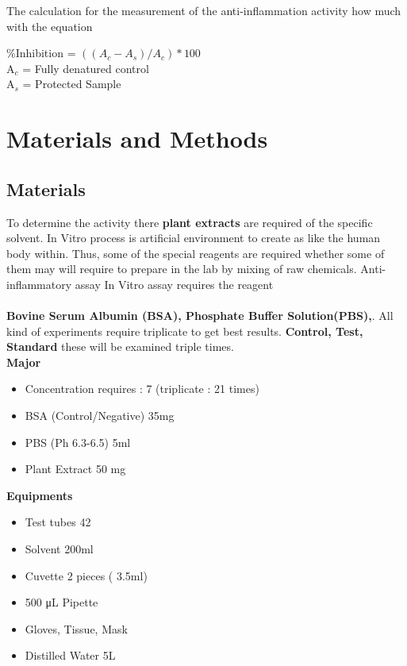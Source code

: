 \documentclass{comjnl}
\begin{document}
The calculation for the measurement of the anti-inflammation activity how much with the equation
\begin{center}
    \%Inhibition = $((A_c - A_s)/ A_c ) *100$ \\
  A$_{c}$ = Fully denatured control \\
  A$_{s}$ = Protected Sample
\end{center}


\section{Materials and Methods}  \label{Performance}

\subsection{Materials}
 To determine the activity there \textbf{plant extracts} are required of the specific solvent.
 In Vitro process is artificial environment to create as like the human body within. 
Thus, some of the special reagents are required whether some of them may will require to prepare in the lab by mixing of raw chemicals. Anti-inflammatory assay In Vitro assay requires the reagent 
 \\
 \\
\textbf{Bovine Serum Albumin (BSA), Phosphate Buffer Solution(PBS),}.
All kind of experiments require triplicate to get best results.
\textbf{Control, Test, Standard} these will be examined triple times. \\
\textbf{Major}
\begin{itemize}
    \item [1] Concentration requires : 7  (triplicate : 21 times) 
    \item [2] BSA  (Control/Negative) 35mg
    \item [3] PBS  (Ph 6.3-6.5) 5ml
    \item [4] Plant Extract 50 mg
\end{itemize}


\textbf{Equipments}
\begin{itemize}
    \item Test tubes 42 
    \item Solvent 200ml
    \item Cuvette 2 pieces ( 3.5ml)
    \item 500 \unit{\micro\liter} Pipette 
    \item Gloves, Tissue, Mask
    \item Distilled Water 5L
\end{itemize} \\ 
\end{document}
